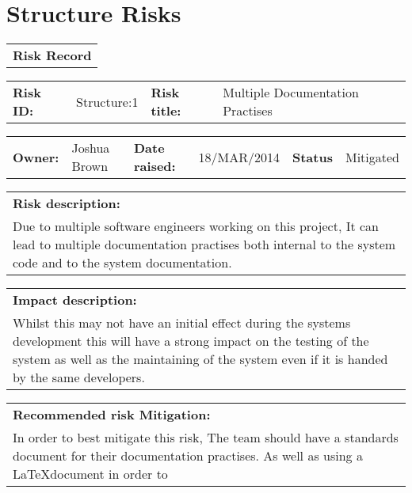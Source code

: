 \FloatBarrier

\section{Structure Risks}
\label{Structure_Risks}

\FloatBarrier

\begin{table}
	\begin{tabularx}{\textwidth}{| X |}
		\hline
		\textbf{Risk Record} \\
	\end{tabularx}
	\begin{tabularx}{\textwidth}{| l | X | l | X |}
		\hline
		\textbf{Risk ID:} & Structure:1 & \textbf{Risk title:} & Multiple Documentation Practises  \\
	\end{tabularx}
	\begin{tabularx}{\textwidth}{| l | X | l | X | l | X |}
		\hline
		\textbf{Owner:} & Joshua Brown & \textbf{Date raised:} & 18/MAR/2014 & \textbf{Status} & Mitigated \\
	\end{tabularx}
	\begin{tabularx}{\textwidth}{| X |}
		\hline
		\textbf{Risk description:} \\ Due to multiple software engineers working on this project, It can lead to multiple documentation practises both internal to the system code and to the system documentation.  \\
	\end{tabularx}
	\begin{tabularx}{\textwidth}{| X |}
		\hline
		\textbf{Impact description:} \\ Whilst this may not have an initial effect during the systems development this will have a strong impact on the testing of the system as well as the maintaining of the system even if it is handed by the same developers. \\
	\end{tabularx}
	\begin{tabularx}{\textwidth}{| X |}
		\hline
		\textbf{Recommended risk Mitigation:} \\ In order to best mitigate this risk, The team should have a standards document for their documentation practises. As well as using a \LaTeX document in order to  \\
	\end{tabularx}
	\begin{tabularx}{\textwidth}{| X |}

\end{tabularx}
\end{table}
